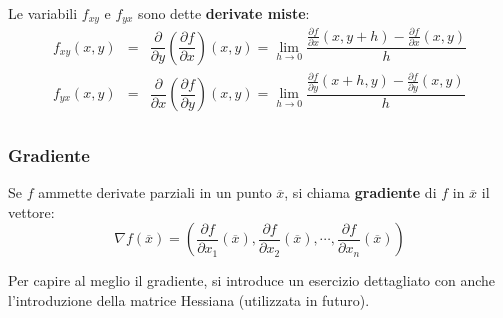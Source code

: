 \documentclass[a4paper]{article}
\newcommand{\definition}[1]{\textcolor{Red3}{\textbf{#1}}}
\begin{document}
	Le variabili $f_{xy}$ e $f_{yx}$ sono dette \definition{derivate miste}:
	\begin{equation}\label{eq: derivate parziali miste}
		\begin{array}{rcl}
			f_{xy}\left(x, y\right) 
			&=& 
			\dfrac{\partial}{\partial y}\left(\dfrac{\partial f}{\partial x}\right)\left(x,y\right)
			=
			\displaystyle\lim_{h \rightarrow 0} \dfrac{\frac{\partial f}{\partial x}\left(x, y+h\right) - \frac{\partial f}{\partial x}\left(x, y\right)}{h} \\ [2em]
			f_{yx}\left(x, y\right) 
			&=& 
			\dfrac{\partial}{\partial x}\left(\dfrac{\partial f}{\partial y}\right)\left(x,y\right)
			=
			\displaystyle\lim_{h \rightarrow 0} \dfrac{\frac{\partial f}{\partial y}\left(x+h, y\right) - \frac{\partial f}{\partial y}\left(x, y\right)}{h} \\ [2em]
		\end{array}
	\end{equation}\newpage

	\subsubsection{Gradiente}\label{subsubsection: gradiente}

	\begin{boxdef}
		Se $f$ ammette derivate parziali in un punto $\overline{x}$, si chiama \definition{gradiente} di $f$ in $\overline{x}$ il vettore:
		\begin{equation}\label{eq: gradiente}
			\nabla f\left(\overline{x}\right) = 
			\left(
				\dfrac{\partial f}{\partial x_{1}}\left(\overline{x}\right), 
				\dfrac{\partial f}{\partial x_{2}}\left(\overline{x}\right), 
				\cdots, 
				\dfrac{\partial f}{\partial x_{n}}\left(\overline{x}\right)
			\right)
		\end{equation}
	\end{boxdef}

	\noindent
	Per capire al meglio il gradiente, si introduce un esercizio dettagliato con anche l'introduzione della matrice Hessiana (utilizzata in futuro).
\end{document}
